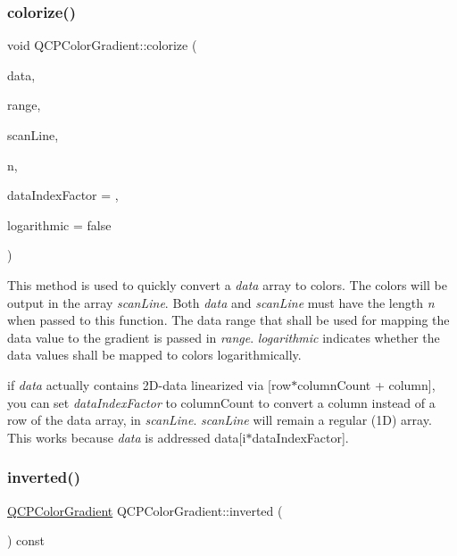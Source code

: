 \subsubsection{\texorpdfstring{colorize()}{colorize()}}
{\footnotesize\ttfamily void Q\+C\+P\+Color\+Gradient\+::colorize (\begin{DoxyParamCaption}\item[{const double $\ast$}]{data,  }\item[{const \hyperlink{class_q_c_p_range}{Q\+C\+P\+Range} \&}]{range,  }\item[{Q\+Rgb $\ast$}]{scan\+Line,  }\item[{int}]{n,  }\item[{int}]{data\+Index\+Factor = {},  }\item[{bool}]{logarithmic = {\ttfamily false} }\end{DoxyParamCaption})}

This method is used to quickly convert a {\itshape data} array to colors. The colors will be output in the array {\itshape scan\+Line}. Both {\itshape data} and {\itshape scan\+Line} must have the length {\itshape n} when passed to this function. The data range that shall be used for mapping the data value to the gradient is passed in {\itshape range}. {\itshape logarithmic} indicates whether the data values shall be mapped to colors logarithmically.

if {\itshape data} actually contains 2\+D-\/data linearized via {\ttfamily \mbox{[}row$\ast$column\+Count + column\mbox{]}}, you can set {\itshape data\+Index\+Factor} to {\ttfamily column\+Count} to convert a column instead of a row of the data array, in {\itshape scan\+Line}. {\itshape scan\+Line} will remain a regular (1D) array. This works because {\itshape data} is addressed {\ttfamily data\mbox{[}i$\ast$data\+Index\+Factor\mbox{]}}. \hypertarget{class_q_c_p_color_gradient_a9f72f501de429829ec446333316decda}{}\label{class_q_c_p_color_gradient_a9f72f501de429829ec446333316decda} 
\subsubsection{\texorpdfstring{inverted()}{inverted()}}
{\footnotesize\ttfamily \hyperlink{class_q_c_p_color_gradient}{Q\+C\+P\+Color\+Gradient} Q\+C\+P\+Color\+Gradient\+::inverted (\begin{DoxyParamCaption}{ }\end{DoxyParamCaption}) const}

